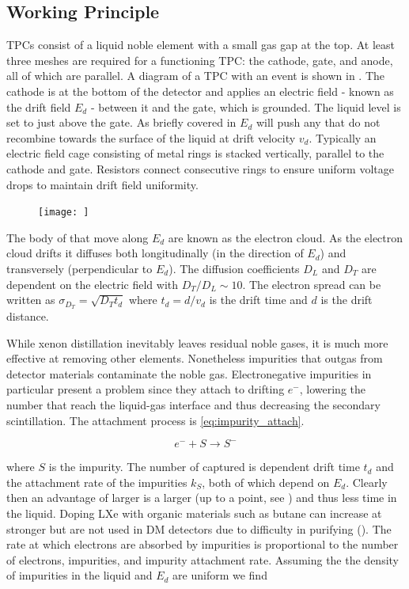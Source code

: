 \subsection{Working Principle}
\label{subsec:tpcs_working_principle}
TPCs consist of a liquid noble element with a small gas gap at the top.  At least three meshes are required for a functioning TPC: the
cathode, gate, and anode, all of which are parallel.  A diagram of a TPC with an event is shown in .  The cathode is
at the bottom of the detector and applies an electric field - known as the drift field $E_{d}$ - between
it and the gate, which is grounded.  The liquid level is set to just above the gate.  As briefly covered in 
$E_{d}$ will push any \electron that do not recombine towards the surface of the liquid at drift velocity $v_{d}$.  Typically an electric
field cage consisting
of metal rings is stacked vertically, parallel to the cathode and gate.  Resistors connect consecutive rings to ensure uniform voltage
drops to maintain drift field uniformity.

\begin{figure}
\texttt{[image: ]}
\label{fig:tpcs_tpc}
\end{figure}

The body of \electron that move along $E_{d}$ are known as the electron cloud.  As the electron cloud drifts it diffuses both
longitudinally (in the direction of $E_{d}$) and transversely (perpendicular to $E_{d}$).  The
diffusion coefficients $D_{L}$ and $D_{T}$ are dependent on the electric field with $D_{T}/D_{L} \sim 10$.  The electron spread can
be written as $\sigma_{D_{T}} = \sqrt{D_{T} t_{d}}$ where $t_{d} = d/v_{d}$ is the drift time and $d$ is the drift distance.

While xenon distillation inevitably leaves residual noble gases, it is much more effective at removing other elements.  Nonetheless
impurities that outgas from detector materials contaminate the noble gas.  Electronegative impurities in particular present a problem
since they attach to drifting $e^{-}$,
lowering the number that reach the liquid-gas interface and thus decreasing the secondary scintillation.  The attachment process
is \eqref{eq:impurity_attach}.

\begin{equation}
e^{-} + S \rightarrow S^{-}
\label{eq:impurity_attach}
\end{equation}

\noindent where $S$ is the impurity.  The number of \electron captured is dependent drift time $t_{d}$ and the
attachment rate of
the impurities $k_{S}$, both of which depend on $E_{d}$.  Clearly then an advantage of larger
\efields is a larger
\vd (up to a point, see ) and thus less time in the liquid.  Doping LXe with organic materials such as butane
can increase \vd at stronger
\efields but are not used in DM detectors due to difficulty in purifying ().  The rate at which electrons are
absorbed by impurities is proportional to the number of electrons, impurities, and impurity attachment rate.  Assuming the the density
of impurities in the liquid and $E_{d}$ are uniform we find


